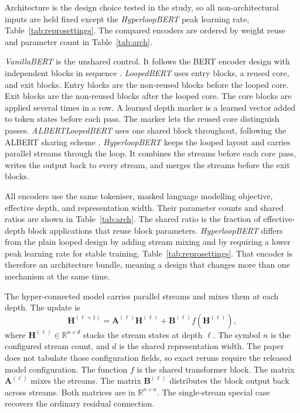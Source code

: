 \documentclass[sigconf,natbib=true,anonymous=true]{acmart}
\begin{document}
Architecture is the design choice tested in the study, so all non-architectural
inputs are held fixed except the \emph{HyperloopBERT} peak learning rate,
Table~\ref{tab:reprosettings}. The compared encoders are ordered by weight reuse
and parameter count in Table~\ref{tab:arch}.

\emph{VanillaBERT} is the unshared control. It follows the BERT encoder design
with independent blocks in sequence \citep{devlin2019bert}. \emph{LoopedBERT}
uses entry blocks, a reused core, and exit blocks. Entry blocks are the
non-reused blocks before the looped core. Exit blocks are the non-reused blocks
after the looped core. The core blocks are applied several times in a row. A
learned depth marker is a learned vector added to token states before each pass.
The marker lets the reused core distinguish passes. \emph{ALBERTLoopedBERT}
uses one shared block throughout, following the ALBERT sharing scheme
\citep{lan2020albert}. \emph{HyperloopBERT} keeps the looped layout and carries
parallel streams through the loop. It combines the streams before each core
pass, writes the output back to every stream, and merges the streams before the
exit blocks.

All encoders use the same tokeniser, masked language modelling objective,
effective depth, and representation width. Their parameter counts and shared
ratios are shown in Table~\ref{tab:arch}. The shared ratio is the fraction of
effective-depth block applications that reuse block parameters.
\emph{HyperloopBERT} differs from the plain looped design by adding stream
mixing and by requiring a lower peak learning rate for stable training,
Table~\ref{tab:reprosettings}. That encoder is therefore an architecture bundle,
meaning a design that changes more than one mechanism at the same time.

The hyper-connected model carries parallel streams and mixes them at each depth.
The update is
%
\begin{equation}
\mathbf{H}^{(\ell+1)} = \mathbf{A}^{(\ell)}\mathbf{H}^{(\ell)}
                      + \mathbf{B}^{(\ell)} f\!\left(\mathbf{H}^{(\ell)}\right),
\end{equation}
%
where $\mathbf{H}^{(\ell)} \in \mathbb{R}^{n \times d}$ stacks the stream states
at depth $\ell$. The symbol $n$ is the configured stream count, and $d$ is the
shared representation width. The paper does not tabulate those configuration
fields, so exact reruns require the released model configuration. The function
$f$ is the shared transformer block. The matrix $\mathbf{A}^{(\ell)}$ mixes the
streams. The matrix $\mathbf{B}^{(\ell)}$ distributes the block output back
across streams. Both matrices are in $\mathbb{R}^{n \times n}$. The
single-stream special case recovers the ordinary residual connection.
\end{document}

